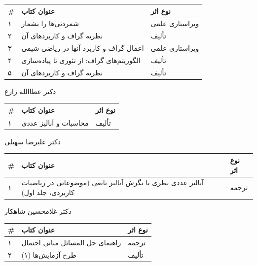\documentclass[
  letterpaper,
  DIV=11,
  numbers=noendperiod]{scrreprt}
\newcounter{none} %
\begin{document}
{\def\LTcaptype{none} %
\begin{longtable}[]{@{}lll@{}}
\toprule\noalign{}
\# & عنوان کتاب & نوع اثر \\
\midrule\noalign{}
\endhead
\bottomrule\noalign{}
\endlastfoot
۱ & شمردنی‌ها را بشمار & ویراستاری علمی \\
۲ & نظریه گراف و کاربردهای آن & تألیف \\
۳ & اعمال گراف و کاربرد آنها در ریاضی-شیمی & ویراستاری علمی \\
۴ & الگوریتم‌های گراف: از تئوری تا پیاده‌سازی & تألیف \\
۵ & نظریه گراف و کاربردهای آن & تألیف \\
\end{longtable}
}

دکتر عطاالله زارع

{\def\LTcaptype{none} %
\begin{longtable}[]{@{}lll@{}}
\toprule\noalign{}
\# & عنوان کتاب & نوع اثر \\
\midrule\noalign{}
\endhead
\bottomrule\noalign{}
\endlastfoot
۱ & محاسبات و آنالیز عددی & تألیف \\
\end{longtable}
}

دکتر علیرضا سهیلی

{\def\LTcaptype{none} %
\begin{longtable}[]{@{}
  >{\raggedright\arraybackslash}p{}
  >{\raggedright\arraybackslash}p{}
  >{\raggedright\arraybackslash}p{}@{}}
\toprule\noalign{}
\begin{minipage}[b]{\linewidth}\raggedright
\#
\end{minipage} & \begin{minipage}[b]{\linewidth}\raggedright
عنوان کتاب
\end{minipage} & \begin{minipage}[b]{\linewidth}\raggedright
نوع اثر
\end{minipage} \\
\midrule\noalign{}
\endhead
\bottomrule\noalign{}
\endlastfoot
۱ & آنالیز عددی نظری با نگرش آنالیز تابعی (موضوعاتی در ریاضیات کاربردی،
جلد اول) & ترجمه \\
\end{longtable}
}

دکتر غلامحسین شاهکار

{\def\LTcaptype{none} %
\begin{longtable}[]{@{}lll@{}}
\toprule\noalign{}
\# & عنوان کتاب & نوع اثر \\
\midrule\noalign{}
\endhead
\bottomrule\noalign{}
\endlastfoot
۱ & راهنمای حل المسائل مبانی احتمال & ترجمه \\
۲ & طرح آزمایش‌ها (۱) & تألیف \\
\end{longtable}
}
\end{document}
